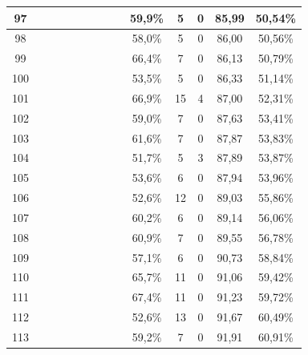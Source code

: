 \begin{longtable}{|c|c|c|c|c|c|c|c|c|c|c|c|c|c|}
97  &  \x    & \x    & \x    &       &       & \x    & \x    &       & 59,9\% &  5  & 0  & 85,99 & 50,54\% \\ \hline
98  &  \x    & \x    &       &       & \x    & \x    &       &       & 58,0\% &  5  & 0  & 86,00 & 50,56\% \\ \hline
99  &  \x    & \x    & \x    &       & \x\m  &       &       & \x    & 66,4\% &  7  & 0  & 86,13 & 50,79\% \\ \hline
100 &  \x    & \x    &       & \x    &       & \x    &       &       & 53,5\% &  5  & 0  & 86,33 & 51,14\% \\ \hline
101 &  \x    & \x    &       &       & \x\m  &       &       & \x\m  & 66,9\% &  15 & 4  & 87,00 & 52,31\% \\ \hline
102 &  \x    & \x    & \x    &       &       & \x    &       & \x\m  & 59,0\% &  7  & 0  & 87,63 & 53,41\% \\ \hline
103 &  \x    & \x    & \x    & \x    &       & \x\m  & \x\m  &       & 61,6\% &  7  & 0  & 87,87 & 53,83\% \\ \hline
104 &  \x    & \x    &       &       &       & \x    &       &       & 51,7\% &  5  & 3  & 87,89 & 53,87\% \\ \hline
105 &  \x    & \x    &       & \x    &       &       &       &       & 53,6\% &  6  & 0  & 87,94 & 53,96\% \\ \hline
106 &  \x    & \x    &       &       &       &       &       &       & 52,6\% &  12 & 0  & 89,03 & 55,86\% \\ \hline
107 &  \x    & \x    & \x    &       &       & \x    & \x\m  &       & 60,2\% &  6  & 0  & 89,14 & 56,06\% \\ \hline
108 &  \x    & \x    & \x    & \x    &       &       &       & \x    & 60,9\% &  7  & 0  & 89,55 & 56,78\% \\ \hline
109 &  \x    & \x    &       &       & \x    & \x    & \x    &       & 57,1\% &  6  & 0  & 90,73 & 58,84\% \\ \hline
110 &  \x    & \x    &       & \x    & \x\m  &       &       &       & 65,7\% &  11 & 0  & 91,06 & 59,42\% \\ \hline
111 &  \x    & \x    &       &       & \x\m  &       &       &       & 67,4\% &  11 & 0  & 91,23 & 59,72\% \\ \hline
112 &  \x    & \x    &       &       &       &       &       & \x\m  & 52,6\% &  13 & 0  & 91,67 & 60,49\% \\ \hline
113 &  \x    & \x    & \x    &       &       & \x\m  &       & \x\m  & 59,2\% &  7  & 0  & 91,91 & 60,91\% \\ \hline

\end{longtable}
